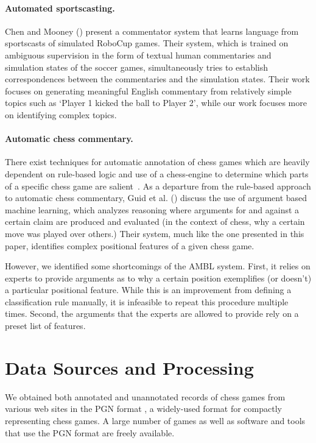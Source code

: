 \documentclass[11pt]{article}
\begin{document}
\paragraph{Automated sportscasting.} Chen and Mooney (\cite{chen}) present a commentator system that learns language from sportscasts of simulated RoboCup games. Their system, which is trained on ambiguous supervision in the form of textual human commentaries and simulation states of the soccer games, simultaneously tries to establish correspondences between the commentaries and the simulation states. Their work focuses on generating meaningful English commentary from relatively simple topics such as ‘Player 1 kicked the ball to Player 2’, while our work focuses more on identifying complex topics.

\paragraph{Automatic chess commentary.} There exist techniques for automatic annotation of chess games which are heavily dependent on rule-based logic and use of a chess-engine to determine which parts of a specific chess game are salient~\cite{cambridge-chess-annotation}. As a departure from the rule-based approach to automatic chess commentary, Guid et al. (\cite{Guid}) discuss the use of argument based machine learning, which analyzes reasoning where arguments for and against a certain claim are produced and evaluated (in the context of chess, why a certain move was played over others.) Their system, much like the one presented in this paper, identifies complex positional features of a given chess game.

However, we identified some shortcomings of the AMBL system. First, it relies on experts to provide arguments as to why a certain position exemplifies (or doesn’t) a particular positional feature. While this is an improvement from defining a classification rule manually, it is infeasible to repeat this procedure multiple times. Second, the arguments that the experts are allowed to provide rely on a preset list of features.

\section{Data Sources and Processing}
We obtained both annotated and unannotated records of chess games from various web sites in the PGN format \cite{pgn}, a widely-used format for compactly representing chess games. A large number of games as well as software and tools that use the PGN format are freely available. 
\end{document}
